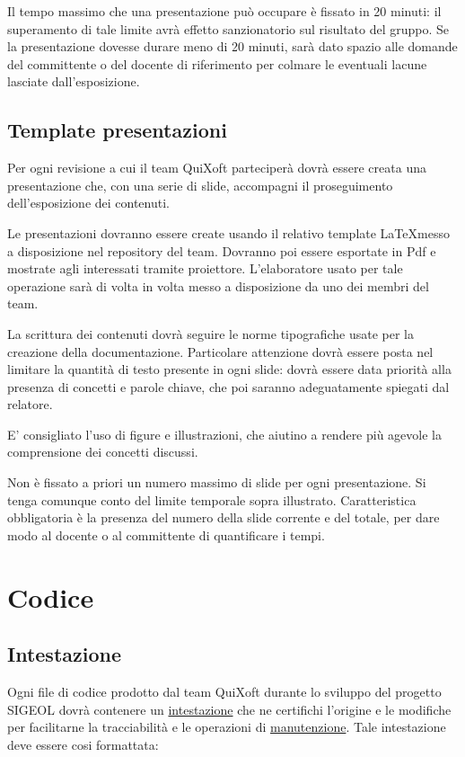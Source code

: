 \documentclass[11pt,a4paper]{article}
\begin{document}
Il tempo massimo che una presentazione può occupare è fissato in 20 minuti: il superamento di tale limite avrà effetto sanzionatorio sul risultato del gruppo.
Se la presentazione dovesse durare meno di 20 minuti, sarà dato spazio alle domande del committente o del docente di riferimento per colmare le eventuali lacune lasciate dall'esposizione.
\subsection{Template presentazioni}
Per ogni revisione a cui il team QuiXoft parteciperà dovrà essere creata una presentazione che, con una serie di slide, accompagni il proseguimento dell'esposizione dei contenuti.

Le presentazioni dovranno essere create usando il relativo template \LaTeX \space messo a disposizione nel repository del team.
Dovranno poi essere esportate in Pdf e mostrate agli interessati tramite proiettore.
L'elaboratore usato per tale operazione sarà di volta in volta messo a disposizione da uno dei membri del team.

La scrittura dei contenuti dovrà seguire le norme tipografiche usate per la creazione della documentazione.
Particolare attenzione dovrà essere posta nel limitare la quantità di testo presente in ogni slide: dovrà essere data priorità alla presenza di concetti e parole chiave, che poi saranno adeguatamente spiegati dal relatore.

E' consigliato l'uso di figure e illustrazioni, che aiutino a rendere più agevole la comprensione dei concetti discussi.

Non è fissato a priori un numero massimo di slide per ogni presentazione. Si tenga comunque conto del limite temporale sopra illustrato.
Caratteristica obbligatoria è la presenza del numero della slide corrente e del totale, per dare modo al docente o al committente di quantificare i tempi.
\section{Codice}
\subsection{Intestazione}
Ogni file di codice prodotto dal team QuiXoft durante lo sviluppo del progetto SIGEOL dovrà contenere un \underline{intestazione} che ne certifichi l'origine e le modifiche per facilitarne la tracciabilità e le operazioni di \underline{manutenzione}.
Tale intestazione deve essere cosi formattata: \\
\end{document}
